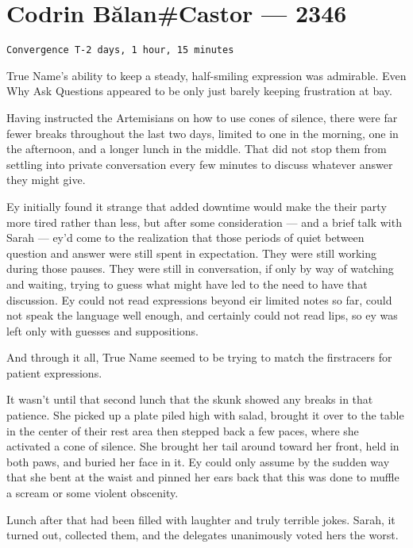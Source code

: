 \hypertarget{codrin-bux103lancastor-2346}{%
\chapter{Codrin Bălan\#Castor — 2346}\label{codrin-bux103lancastor-2346}}

\begin{verbatim}
Convergence T-2 days, 1 hour, 15 minutes
\end{verbatim}

True Name's ability to keep a steady, half-smiling expression was admirable. Even Why Ask Questions appeared to be only just barely keeping frustration at bay.

Having instructed the Artemisians on how to use cones of silence, there were far fewer breaks throughout the last two days, limited to one in the morning, one in the afternoon, and a longer lunch in the middle. That did not stop them from settling into private conversation every few minutes to discuss whatever answer they might give.

Ey initially found it strange that added downtime would make the their party more tired rather than less, but after some consideration — and a brief talk with Sarah — ey'd come to the realization that those periods of quiet between question and answer were still spent in expectation. They were still working during those pauses. They were still in conversation, if only by way of watching and waiting, trying to guess what might have led to the need to have that discussion. Ey could not read expressions beyond eir limited notes so far, could not speak the language well enough, and certainly could not read lips, so ey was left only with guesses and suppositions.

And through it all, True Name seemed to be trying to match the firstracers for patient expressions.

It wasn't until that second lunch that the skunk showed any breaks in that patience. She picked up a plate piled high with salad, brought it over to the table in the center of their rest area then stepped back a few paces, where she activated a cone of silence. She brought her tail around toward her front, held in both paws, and buried her face in it. Ey could only assume by the sudden way that she bent at the waist and pinned her ears back that this was done to muffle a scream or some violent obscenity.

Lunch after that had been filled with laughter and truly terrible jokes. Sarah, it turned out, collected them, and the delegates unanimously voted hers the worst.

